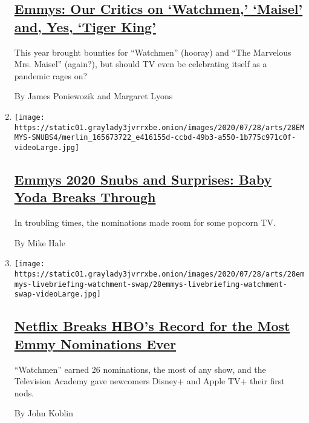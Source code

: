 \begin{enumerate}
{  \subsection{\texorpdfstring{\href{/2020/07/28/arts/television/emmys-watchmen-handmaids-tale-tiger-king.html}{Emmys:
  Our Critics on `Watchmen,' `Maisel' and, Yes, `Tiger
  King'}}{Emmys: Our Critics on `Watchmen,' `Maisel' and, Yes, `Tiger King'}}\label{emmys-our-critics-on-watchmen-maisel-and-yes-tiger-king}}

  This year brought bounties for ``Watchmen'' (hooray) and ``The
  Marvelous Mrs. Maisel'' (again?), but should TV even be celebrating
  itself as a pandemic rages on?

  By James Poniewozik and Margaret Lyons
\item
  \texttt{[image: https://static01.graylady3jvrrxbe.onion/images/2020/07/28/arts/28EMMYS-SNUBS4/merlin\_165673722\_e416155d-ccbd-49b3-a550-1b775c971c0f-videoLarge.jpg]}

  \hypertarget{emmys-2020-snubs-and-surprises-baby-yoda-breaks-through}{%
  \subsection{\texorpdfstring{\href{/2020/07/28/arts/television/emmys-snubs-mandalorian-zendaya-reese.html}{Emmys
  2020 Snubs and Surprises: Baby Yoda Breaks
  Through}}{Emmys 2020 Snubs and Surprises: Baby Yoda Breaks Through}}\label{emmys-2020-snubs-and-surprises-baby-yoda-breaks-through}}

  In troubling times, the nominations made room for some popcorn TV.

  By Mike Hale
\item
  \texttt{[image: https://static01.graylady3jvrrxbe.onion/images/2020/07/28/arts/28emmys-livebriefing-watchment-swap/28emmys-livebriefing-watchment-swap-videoLarge.jpg]}

  \hypertarget{netflix-breaks-hbos-record-for-the-most-emmy-nominations-ever}{%
  \subsection{\texorpdfstring{\href{/2020/07/28/arts/television/emmy-nominations.html}{Netflix
  Breaks HBO's Record for the Most Emmy Nominations
  Ever}}{Netflix Breaks HBO's Record for the Most Emmy Nominations Ever}}\label{netflix-breaks-hbos-record-for-the-most-emmy-nominations-ever}}

  ``Watchmen'' earned 26 nominations, the most of any show, and the
  Television Academy gave newcomers Disney+ and Apple TV+ their first
  nods.

  By John Koblin
\end{enumerate}

